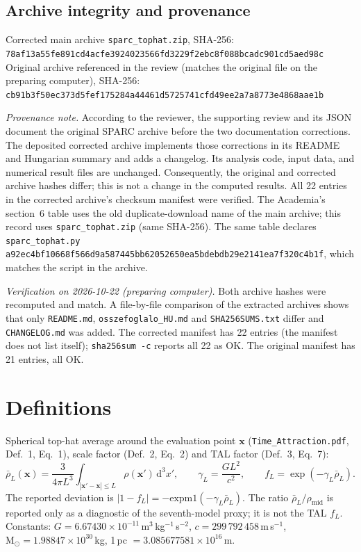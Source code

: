 \documentclass[10pt,a4paper]{article}
\newcommand{\hash}[1]{{\footnotesize\texttt{#1}}}
\newcommand{\Msun}{\mathrm{M}_\odot}
\begin{document}
\subsection{Archive integrity and provenance}
Corrected main archive \texttt{sparc\_tophat.zip}, SHA-256:\\
\hash{78af13a55fe891cd4acfe3924023566fd3229f2ebc8f088bcadc901cd5aed98c}\\
Original archive referenced in the review (matches the original file on the preparing computer), SHA-256:\\
\hash{cb91b3f50ec373d5fef175284a44461d5725741cfd49ee2a7a8773e4868aae1b}

\noindent\emph{Provenance note.} According to the reviewer, the supporting review and its JSON document the original SPARC archive before the two documentation corrections. The deposited corrected archive implements those corrections in its README and Hungarian summary and adds a changelog. Its analysis code, input data, and numerical result files are unchanged. Consequently, the original and corrected archive hashes differ; this is not a change in the computed results. All 22 entries in the corrected archive's checksum manifest were verified. The Academia's section~6 table uses the old duplicate-download name of the main archive; this record uses \texttt{sparc\_tophat.zip} (same SHA-256). The same table declares \texttt{sparc\_tophat.py} \hash{a92ec4bf10668f566d9a587445bb62052650ea5bdebdb29e2141ea7f320c4b1f}, which matches the script in the archive.

\noindent\emph{Verification on 2026-10-22 (preparing computer).} Both archive hashes were recomputed and match. A file-by-file comparison of the extracted archives shows that only \texttt{README.md}, \texttt{osszefoglalo\_HU.md} and \texttt{SHA256SUMS.txt} differ and \texttt{CHANGELOG.md} was added. The corrected manifest has 22 entries (the manifest does not list itself); \texttt{sha256sum -c} reports all 22 as OK. The original manifest has 21 entries, all OK.

\section{Definitions}
Spherical top-hat average around the evaluation point $\mathbf{x}$ (\texttt{Time\_Attraction.pdf}, Def.~1, Eq.~1), scale factor (Def.~2, Eq.~2) and TAL factor (Def.~3, Eq.~7):
\begin{equation*}
\bar\rho_L(\mathbf{x})=\frac{3}{4\pi L^3}\int_{|\mathbf{x}'-\mathbf{x}|\le L}\rho(\mathbf{x}')\,\mathrm{d}^3x',\qquad
\gamma_L=\frac{GL^2}{c^2},\qquad f_L=\exp(-\gamma_L\bar\rho_L).
\end{equation*}
The reported deviation is $|1-f_L|=-\mathrm{expm1}(-\gamma_L\bar\rho_L)$. The ratio $\bar\rho_L/\rho_\mathrm{mid}$ is reported only as a diagnostic of the seventh-model proxy; it is not the TAL $f_L$. Constants: $G=6.67430\times10^{-11}$\,m$^3$\,kg$^{-1}$\,s$^{-2}$, $c=299\,792\,458$\,m\,s$^{-1}$, $\Msun=1.98847\times10^{30}$\,kg, 1\,pc $=3.085677581\times10^{16}$\,m.
\end{document}
